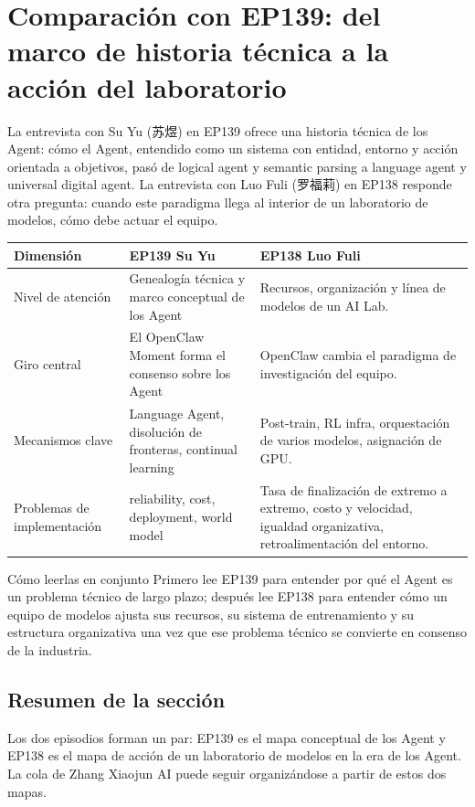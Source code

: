 \section{Comparación con EP139: del marco de historia técnica a la acción del laboratorio}

La entrevista con Su Yu (苏煜) en EP139 ofrece una historia técnica de los Agent: cómo el Agent, entendido como un sistema con entidad, entorno y acción orientada a objetivos, pasó de logical agent y semantic parsing a language agent y universal digital agent. La entrevista con Luo Fuli (罗福莉) en EP138 responde otra pregunta: cuando este paradigma llega al interior de un laboratorio de modelos, cómo debe actuar el equipo.

\noindent\begin{tabularx}{\textwidth}{p{}p{}X}
\toprule
Dimensión & EP139 Su Yu & EP138 Luo Fuli \\
\midrule
Nivel de atención & Genealogía técnica y marco conceptual de los Agent & Recursos, organización y línea de modelos de un AI Lab. \\
Giro central & El OpenClaw Moment forma el consenso sobre los Agent & OpenClaw cambia el paradigma de investigación del equipo. \\
Mecanismos clave & Language Agent, disolución de fronteras, continual learning & Post-train, RL infra, orquestación de varios modelos, asignación de GPU. \\
Problemas de implementación & reliability, cost, deployment, world model & Tasa de finalización de extremo a extremo, costo y velocidad, igualdad organizativa, retroalimentación del entorno. \\
\bottomrule
\end{tabularx}

\begin{knowledgebox}{Cómo leerlas en conjunto}
Primero lee EP139 para entender por qué el Agent es un problema técnico de largo plazo; después lee EP138 para entender cómo un equipo de modelos ajusta sus recursos, su sistema de entrenamiento y su estructura organizativa una vez que ese problema técnico se convierte en consenso de la industria.
\end{knowledgebox}

\subsection{Resumen de la sección}

Los dos episodios forman un par: EP139 es el mapa conceptual de los Agent y EP138 es el mapa de acción de un laboratorio de modelos en la era de los Agent. La cola de Zhang Xiaojun AI puede seguir organizándose a partir de estos dos mapas.
